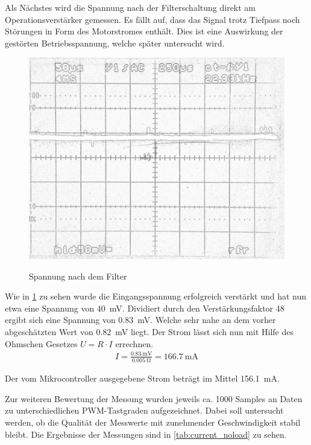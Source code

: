 Als Nächstes wird die Spannung nach der Filterschaltung direkt am Operationsverstärker gemessen. Es fällt auf, dass das Signal trotz Tiefpass noch Störungen in Form des Motorstromes enthält.
Dies ist eine Auswirkung der gestörten Betriebsspannung, welche später untersucht wird.


\begin{figure}[H]
\centering
\includegraphics[width=.8\textwidth]{filter_ausgang.png}\\
\caption{Spannung nach dem Filter}%
\label{fig:filter_ausgang}
\end{figure}


Wie in \cref{fig:filter_ausgang} zu sehen wurde die Eingangsspannung erfolgreich verstärkt und hat nun etwa eine Spannung von \SI{40}{\mV}. Dividiert durch den Verstärkungsfaktor 48 ergibt sich eine Spannung von 
\SI{0,83}{\mV}. Welche sehr nahe an dem vorher abgeschätzten Wert von \SI{0,82}{\mV} liegt. Der Strom lässt sich nun mit Hilfe des Ohmschen Gesetzes $U=R\cdot I$ errechnen.
\begin{align*}
I=\frac{\SI{0,83}{\mV}}{\SI{0,005}{\ohm}}=\SI{166,7}{\mA}
\end{align*}

Der vom Mikrocontroller ausgegebene Strom beträgt im Mittel \SI{156,1}{\mA}.

Zur weiteren Bewertung der Messung wurden jeweils ca. 1000 Samples an Daten zu unterschiedlichen PWM-Tastgraden aufgezeichnet.
Dabei soll untersucht werden, ob die Qualität der Messwerte mit zunehmender Geschwindigkeit stabil bleibt.
Die Ergebnisse der Messungen sind in \cref{tab:current_noload} zu sehen.

